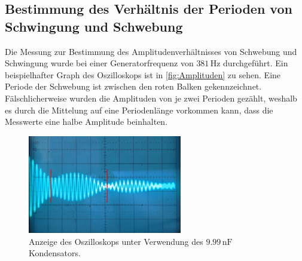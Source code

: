 \subsection{Bestimmung des Verhältnis der Perioden von Schwingung und Schwebung}
\label{subsec:A_Amplituden}
Die Messung zur Bestimmung des Amplitudenverhältnisses von Schwebung und Schwingung wurde bei einer Generatorfrequenz von $381 \, \unit{\hertz}$ durchgeführt.
Ein beispielhafter Graph des Oszilloskops ist in \autoref{fig:Amplituden} zu sehen. Eine Periode der Schwebung ist zwischen den roten Balken gekennzeichnet.
Fälschlicherweise wurden die Amplituden von je zwei Perioden gezählt, weshalb es durch die Mittelung auf eine Periodenlänge vorkommen kann, dass die Messwerte eine 
\dq halbe\dq \; Amplitude beinhalten.
\begin{figure}
    \centering 
    \includegraphics[width = 0.6\textwidth]{content/Amplituden.jpg}
    \caption{Anzeige des Oszilloskops unter Verwendung des $9.99 \, \unit{\nano\farad}$ Kondensators.}
    \label{fig:Amplituden}
\end{figure}

